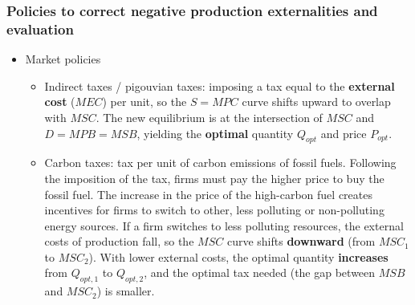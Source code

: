 \documentclass[a4paper,12pt]{article}
\begin{document}
\subsubsection*{Policies to correct negative production externalities and evaluation}
\begin{itemize}
  \item Market policies
  \begin{itemize}
    \item Indirect taxes / pigouvian taxes: imposing a tax equal to the \textbf{external cost} ($MEC$) per unit, so the $S = MPC$ curve shifts upward to overlap with $MSC$. The new equilibrium is at the intersection of $MSC$ and $D = MPB = MSB$, yielding the \textbf{optimal} quantity $Q_{opt}$ and price $P_{opt}$.

\begin{center}
\end{center}
    \item Carbon taxes: tax per unit of carbon emissions of fossil fuels. Following the imposition of the tax, firms must pay the higher price to buy the fossil fuel. The increase in the price of the high-carbon fuel creates incentives for firms to switch to other, less polluting or non-polluting energy sources. If a firm switches to less polluting resources, the external costs of production fall, so the $MSC$ curve shifts \textbf{downward} (from $MSC_1$ to $MSC_2$). With lower external costs, the optimal quantity \textbf{increases} from $Q_{opt,1}$ to $Q_{opt,2}$, and the optimal tax needed (the gap between $MSB$ and $MSC_2$) is smaller.


\end{itemize}
\end{itemize}
\end{document}
